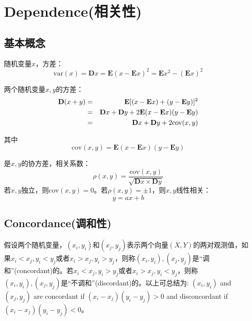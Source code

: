 \section{Dependence(相关性)}
\subsection{基本概念}
随机变量$x$，方差：
\begin{equation}
    \text{var}(x) = \mathbf{D}x = \mathbf{E}(x-\mathbf{E}x)^2 = \mathbf{E}x^2-(\mathbf{E}x)^2
    \label{eq-var}
\end{equation}

两个随机变量$x,y$的方差：
\begin{eqnarray}
    \mathbf{D}(x+y) &=& \mathbf{E}[(x-\mathbf{E}x) + (y-\mathbf{E}y)]^2 \notag \\
    &=&\mathbf{D}x+\mathbf{D}y+2\mathbf{E}(x-\mathbf{E}x)(y-\mathbf{E}y) \notag \\
    &=&\mathbf{D}x+\mathbf{D}y+2\text{cov}(x,y)
    \label{eq-cov-var}
\end{eqnarray}

其中
\begin{equation}
    \text{cov}(x,y) = \mathbf{E}(x-\mathbf{E}x) (y-\mathbf{E}y)
    \label{eq-covariation}
\end{equation}

是$x,y$的协方差，相关系数：
\begin{equation}
    \rho (x,y) = \dfrac{\text{cov}(x,y)}{\sqrt{\mathbf{D}x\times\mathbf{D}y}}
    \label{eq-coefficient}
\end{equation}
若$x,y$独立，则cov$(x,y) = 0$。若$\rho(x,y) = \pm 1$，则$x,y$线性相关：
\begin{equation*}
    y = ax+b
\end{equation*}


\subsection{Concordance(调和性)}
假设两个随机变量，$(x_i,y_i)$和$(x_j,y_j)$表示两个向量$(X,Y)$的两对观测值，如果$x_i<x_j,y_i<y_j$或者$x_i>x_j,y_i>y_j$，则称$(x_i,y_i),(x_j,y_j)$是``调和''(concordant)的。若$x_i<x_j,y_i>y_j$或者$x_i>x_j,y_i<y_j$，则称$(x_i,y_i),(x_j,y_j)$是``不调和''(discordant)的。以上可总结为:
$(x_i,y_i)$ and $(x_j,y_j)$ are concordant if $(x_i-x_j)(y_i-y_j)>0$ and disconcordant if $(x_i-x_j)(y_i-y_j)<0$。

